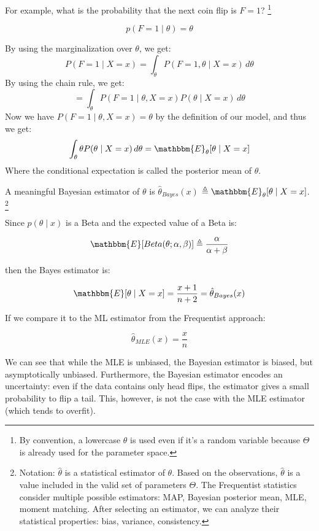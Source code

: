 \documentclass[12pt]{report}
\newcommand{\defobj}[1]{\color{red}#1\color{black}{}}
\newcommand{\defmean}[1]{\color{green!70!black}#1\color{black}{}}
\renewcommand{\emph}[1]{\color{violet}#1\color{black}{}}
\begin{document}
For example, what is the probability that the next coin flip is $ F = 1$? \footnote{By convention, a lowercase $ \theta $ is used even if it's a random variable because $\Theta$ is already used for the parameter space.}

$$ p(F = 1 \mid \theta) = \theta $$

By using the marginalization over $ \theta $, we get:
$$ P(F = 1 \mid X = x) = \int_{\theta} P(F = 1, \theta \mid X = x) \,d\theta$$
By using the chain rule, we get:
$$ = \int_{\theta} P(F = 1 \mid \theta, X = x) P(\theta \mid X = x) \,d\theta $$
Now we have $ P(F = 1 \mid \theta, X = x)= \theta $ by the definition of our model, and thus we get:
$$ \int_{\theta} \theta P(\theta \mid X = x) \,d\theta = \mathbbm{E}_{\theta}\lbrack \theta \mid X = x \rbrack $$
Where the conditional expectation is called the \emph{posterior mean} of $ \theta $.

\noindent A meaningful Bayesian estimator of $ \theta $ is \defobj{$ \hat{\theta}_{Bayes}(x) $} \defmean{$ \triangleq \mathbbm{E}_{\theta}\lbrack \theta \mid X = x \rbrack $}. \footnote{Notation: $ \hat{\theta} $ is a statistical estimator of $ \theta $. Based on the observations, $ \hat{\theta} $ is a value included in the valid set of parameters $ \Theta $. The Frequentist statistics consider multiple possible estimators: MAP, Bayesian posterior mean, MLE, moment matching. After selecting an estimator, we can analyze their statistical properties:
bias, variance, consistency.}

Since $ p(\theta \mid x) $ is a Beta and the expected value of a Beta is:

$$ \mathbbm{E}\lbrack Beta(\theta; \alpha, \beta) \rbrack \triangleq \frac{\alpha}{\alpha + \beta} $$

then the Bayes estimator is:

$$ \mathbbm{E}\lbrack \theta \mid X = x \rbrack = \frac{x + 1}{n + 2} = \hat{\theta}_{Bayes}(x) $$

If we compare it to the ML estimator from the Frequentist approach:

$$ \hat{\theta}_{MLE}(x) = \frac{x}{n} $$

We can see that while the MLE is unbiased, the Bayesian estimator is biased, but asymptotically unbiased. Furthermore, the Bayesian estimator encodes an uncertainty: even if the data contains only head flips, the estimator gives a small probability to flip a tail. This, however, is not the case with the MLE estimator (which tends to overfit).
\end{document}
